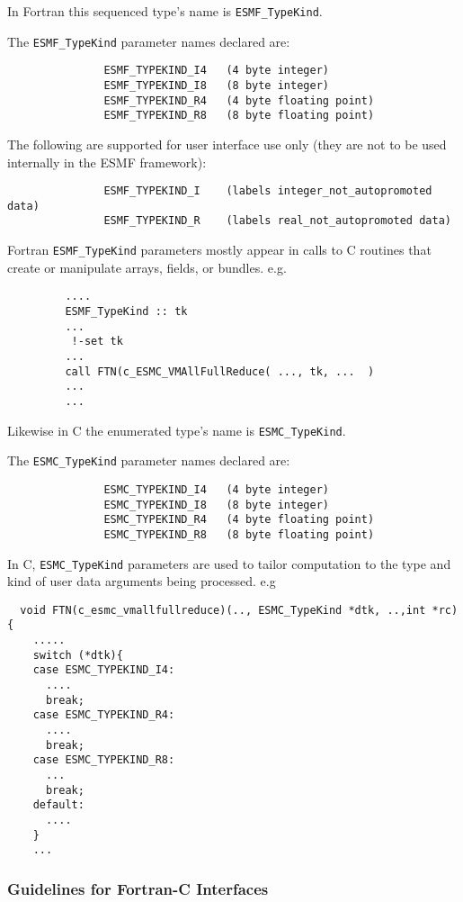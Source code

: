 In Fortran this sequenced type's name is {\tt ESMF\_TypeKind}.

The {\tt ESMF\_TypeKind} parameter names declared are:

\begin{verbatim}
               ESMF_TYPEKIND_I4   (4 byte integer)
               ESMF_TYPEKIND_I8   (8 byte integer)
               ESMF_TYPEKIND_R4   (4 byte floating point)
               ESMF_TYPEKIND_R8   (8 byte floating point)
\end{verbatim}

The following are supported for user interface use only (they are not to be used internally in the ESMF framework):
\begin{verbatim}
               ESMF_TYPEKIND_I    (labels integer_not_autopromoted data)
               ESMF_TYPEKIND_R    (labels real_not_autopromoted data)
\end{verbatim}

Fortran {\tt ESMF\_TypeKind} parameters mostly appear in calls to C routines that create or manipulate arrays, fields, or bundles. e.g.
\begin{verbatim}
         ....
         ESMF_TypeKind :: tk
         ...
          !-set tk
         ...
         call FTN(c_ESMC_VMAllFullReduce( ..., tk, ...  )
         ...
         ...
\end{verbatim}
Likewise in C the enumerated type's name is {\tt ESMC\_TypeKind}.

The {\tt ESMC\_TypeKind} parameter names declared are:
\begin{verbatim}
               ESMC_TYPEKIND_I4   (4 byte integer)
               ESMC_TYPEKIND_I8   (8 byte integer)
               ESMC_TYPEKIND_R4   (4 byte floating point)
               ESMC_TYPEKIND_R8   (8 byte floating point)
\end{verbatim}

In C, {\tt ESMC\_TypeKind} parameters are used to tailor computation to the type and kind of user data arguments being processed. e.g
\begin{verbatim}
  void FTN(c_esmc_vmallfullreduce)(.., ESMC_TypeKind *dtk, ..,int *rc){
    .....      
    switch (*dtk){
    case ESMC_TYPEKIND_I4:
      ....
      break;
    case ESMC_TYPEKIND_R4:
      ....
      break;
    case ESMC_TYPEKIND_R8:
      ...         
      break;
    default:
      ....
    }
    ...
\end{verbatim}

\subsubsection{Guidelines for Fortran-C Interfaces}

